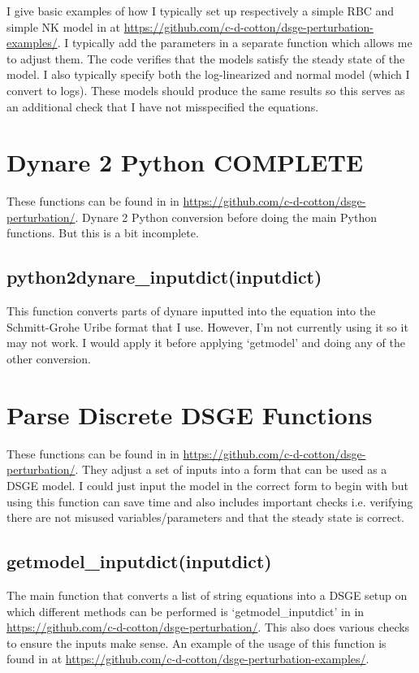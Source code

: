 \documentclass{article}
\theoremstyle{definition}
\begin{document}
I give basic examples of how I typically set up respectively a simple RBC and simple NK model in  at \url{https://github.com/c-d-cotton/dsge-perturbation-examples/}. I typically add the parameters in a separate function which allows me to adjust them. The code verifies that the models satisfy the steady state of the model. I also typically specify both the log-linearized and normal model (which I convert to logs). These models should produce the same results so this serves as an additional check that I have not misspecified the equations.

\section{Dynare 2 Python COMPLETE}
These functions can be found in  in \url{https://github.com/c-d-cotton/dsge-perturbation/}. Dynare 2 Python conversion before doing the main Python functions. But this is a bit incomplete.

\subsection{python2dynare\_inputdict(inputdict)}

This function converts parts of dynare inputted into the equation into the Schmitt-Grohe Uribe format that I use. However, I'm not currently using it so it may not work. I would apply it before applying `getmodel' and doing any of the other conversion.
    
\section{Parse Discrete DSGE Functions}
These functions can be found in  in \url{https://github.com/c-d-cotton/dsge-perturbation/}. They adjust a set of inputs into a form that can be used as a DSGE model. I could just input the model in the correct form to begin with but using this function can save time and also includes important checks i.e. verifying there are not misused variables/parameters and that the steady state is correct.

\subsection{getmodel\_inputdict(inputdict)}

The main function that converts a list of string equations into a DSGE setup on which different methods can be performed is `getmodel\_inputdict' in  in \url{https://github.com/c-d-cotton/dsge-perturbation/}. This also does various checks to ensure the inputs make sense. An example of the usage of this function is found in  at \url{https://github.com/c-d-cotton/dsge-perturbation-examples/}.
\end{document}
